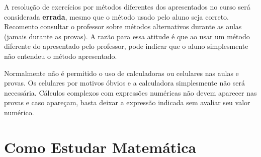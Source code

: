 A resolução de exercícios por métodos diferentes dos apresentados no curso será considerada \textbf{errada}, 
mesmo que o método usado pelo aluno seja correto. Recomento consultar o professor sobre métodos
alternativos durante as aulas (jamais durante as provas). A razão para essa atitude é que 
ao usar um método diferente do apresentado pelo professor, pode indicar que o aluno simplesmente 
não entendeu o método apresentado.

Normalmente não é permitido o uso de calculadoras ou celulares nas aulas e provas. Os celulares por motivos óbvios
e a calculadora simplesmente não será necessária. Cálculos complexos com expressões numéricas não devem aparecer 
nas provas e caso apareçam, basta deixar a expressão indicada sem avaliar seu valor numérico.

\section{Como Estudar Matemática}


